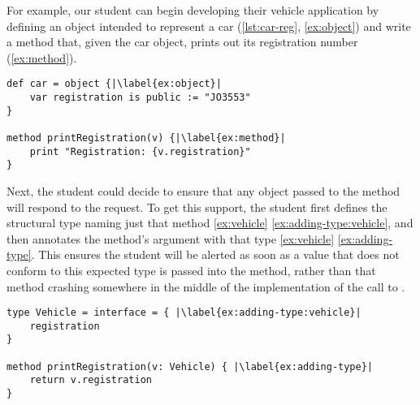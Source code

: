 For example, our student can begin developing their vehicle
application by defining an object intended to represent a car
(\cref{lst:car-reg}, \cref{ex:object}) and write a method that, given
the car object, prints out its registration number (\cref{ex:method}).

\begin{lstlisting}[caption={The start of a simple program for tracking vehicle information.},label=lst:car-reg,escapechar=|,columns=flexible]
def car = object {|\label{ex:object}|
    var registration is public := "JO3553"
}

method printRegistration(v) {|\label{ex:method}|
    print "Registration: {v.registration}"
}
\end{lstlisting}

Next, the student could decide to ensure that any object passed to the
 method will respond to the
 request.  To get this support, the student first
defines the structural type \citep{theCleanVehicle}
naming just that method \cref{ex:vehicle}
\cref{ex:adding-type:vehicle}, and then annotates the
 method's argument with that type
\cref{ex:vehicle} \cref{ex:adding-type}.  This ensures the student
will be alerted as soon as a value that does not conform to this
expected type is passed into the  method,
rather than that method crashing somewhere in the middle of the
implementation of the call to .


\begin{lstlisting}[label={ex:vehicle},caption={Adding a type annotation to a method parameter.},escapechar=|,columns=flexible]
type Vehicle = interface = { |\label{ex:adding-type:vehicle}|
    registration    
}

method printRegistration(v: Vehicle) { |\label{ex:adding-type}|
    return v.registration
}
\end{lstlisting}



